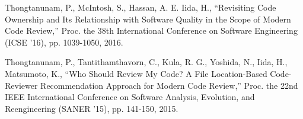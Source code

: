\documentclass{fose2016}           %
\begin{document}
\begin{thebibliography}{10}
Thongtanunam, P., McIntosh, S., Hassan, A. E. Iida, H., ``Revisiting Code Ownership and Its Relationship with Software Quality in the Scope of Modern Code Review,'' Proc. the 38th International Conference on Software Engineering (ICSE '16), pp. 1039-1050, 2016.

Thongtanunam, P., Tantithamthavorn, C., Kula, R. G., Yoshida, N., Iida, H., Matsumoto, K., ``Who Should Review My Code? A File Location-Based Code-Reviewer Recommendation Approach for Modern Code Review,'' Proc. the 22nd IEEE International Conference on Software Analysis, Evolution, and Reengineering (SANER '15), pp. 141-150, 2015.


\end{thebibliography}
\end{document}
